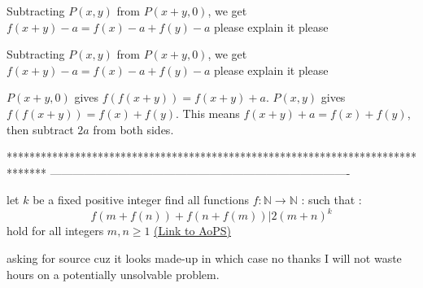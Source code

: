 \begin{solution}
	

Subtracting $P(x,y)$ from $P(x+y,0)$, we get $f(x+y)-a=f(x)-a+f(y)-a$  please explain it please 
\end{solution}



\begin{solution}
	\begin{tcolorbox}Subtracting $P(x,y)$ from $P(x+y,0)$, we get $f(x+y)-a=f(x)-a+f(y)-a$  please explain it please\end{tcolorbox}

$P(x+y, 0)$ gives $f(f(x+y))=f(x+y)+a$. $P(x, y)$ gives $f(f(x+y))=f(x)+f(y)$. This means $f(x+y)+a=f(x)+f(y)$, then subtract $2a$ from both sides.
\end{solution}



*******************************************************************************
-------------------------------------------------------------------------------

\begin{problem}
	let $k$ be a fixed positive integer
find all functions $f : \mathbb{N} \rightarrow \mathbb{N}$ : such that :
 $$f(m+f(n))+f(n+f(m))  | 2 (m+n)^k$$ 
hold for all integers $m,n \geq 1 $
	\flushright \href{https://artofproblemsolving.com/community/c6h1606664}{(Link to AoPS)}
\end{problem}



\begin{solution}
	asking for source cuz it looks made-up in which case no thanks I will not waste hours on a potentially unsolvable problem.
\end{solution}



